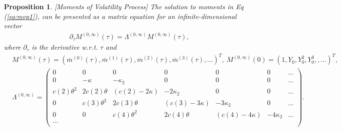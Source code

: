 \documentclass[pdftex,11pt,a4paper] {article}
\newtheorem{proposition}{Proposition}[section]
\begin{document}
\begin{proposition}\label{pr:vol_moments}  [Moments of Volatility Process]
The solution to moments in Eq (\ref{eq:mvp1}), can be presented as a matrix equation for an infinite-dimensional vector
\begin{equation} \label {eq:mvp5}
\begin{split}
&\partial_{\tau}M^{(0,\infty)}(\tau) =\Lambda^{(0,\infty)} M^{(0,\infty)}(\tau),
\end{split}
\end{equation}
where $\partial_{\tau}$ is the derivative w.r.t. $\tau$ and
\begin{equation*}
\begin{split}
& M^{(0,\infty)} (\tau) = \left(\overline{m}^{(0)}(\tau),\overline{m}^{(1)}(\tau),\overline{m}^{(2)}(\tau),\overline{m}^{(3)}(\tau),...
\right)^{T}, \ 
M^{(0,\infty)} (0) =  \left( 1, Y_{0}, Y^{2}_{0}, Y^{3}_{0}, ,... \right)^{T},\\
&\Lambda^{(0,\infty)} = \begin{pmatrix}
0 & 0 & 0 & 0 & 0& 0& ...\\
0 & -\kappa  & -\kappa_{2}  &  0 & 0& 0& ...\\
c(2)\theta^{2} & 2c(2)\theta & (c(2)-  2 \kappa) &  - 2\kappa_{2} & 0& 0& ...\\
0 & c(3)\theta^{2} & 2c(3)\theta & (c(3)- 3\kappa) &  - 3\kappa_{2} & 0& ...\\
0 & 0 &  c(4)\theta^{2} & 2c(4)\theta & (c(4)- 4\kappa) &  - 4\kappa_{2} & ...\\
...\\
\end{pmatrix}.
\end{split}
\end{equation*}


\end{proposition}
\end{document}
